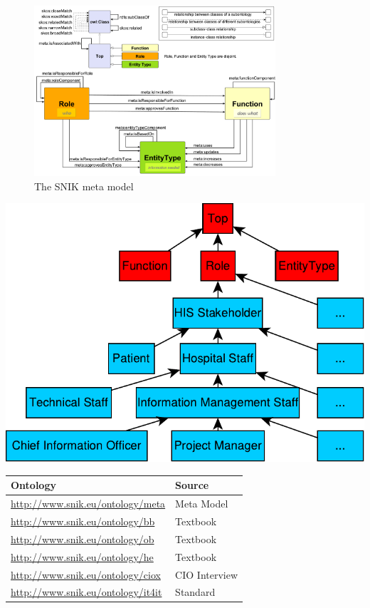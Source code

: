 \documentclass[sw]{iosart2x}
\begin{document}
\begin{figure}
\caption{The SNIK meta model}
\label{fig:metamodel}
\includegraphics[width=0.8\textwidth]{img/metamodel9s.pdf}
\end{figure}

\includegraphics[width=\columnwidth]{img/hierarchy.pdf}
\begin{center}
\begin{tabular*}{\columnwidth}{ll}
\toprule
\textbf{Ontology}				&\textbf{Source}\\
\midrule
\url{http://www.snik.eu/ontology/meta}		&Meta Model\\
\url{http://www.snik.eu/ontology/bb}		&Textbook~\cite{bb}\\
\url{http://www.snik.eu/ontology/ob}		&Textbook~\cite{ob}\\
\url{http://www.snik.eu/ontology/he}		&Textbook~\cite{he}\\
\url{http://www.snik.eu/ontology/ciox}		&CIO Interview\\
\url{http://www.snik.eu/ontology/it4it}		&Standard~\cite{it4it}\\
\bottomrule
\end{tabular*}
\end{center}
\end{document}
